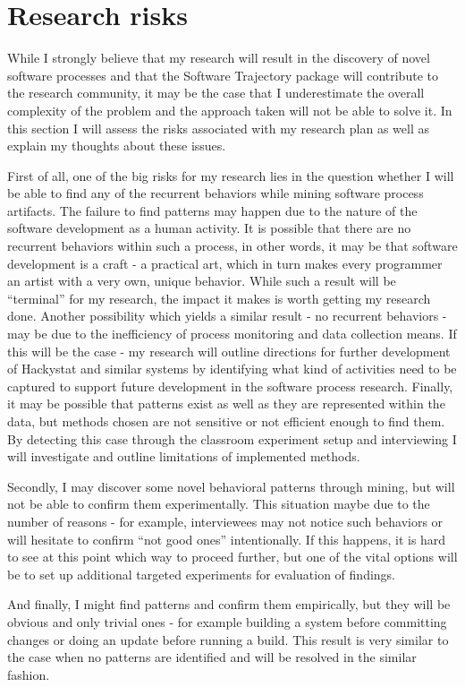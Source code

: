 \documentclass{sig-alternate}
\begin{document}
\section{Research risks}
While I strongly believe that my research will result in the discovery of novel software processes and that the Software Trajectory package will contribute to the research community, it may be the case that I underestimate the overall complexity of the problem and the approach taken will not be able to solve it. In this section I will assess the risks associated with my research plan as well as explain my thoughts about these issues.

First of all, one of the big risks for my research lies in the question whether I will be able to find any of the recurrent behaviors while mining software process artifacts. The failure to find patterns may happen due to the nature of the software development as a human activity. It is possible that there are no recurrent behaviors within such a process, in other words, it may be that software development is a craft - a practical art, which in turn makes every programmer an artist with a very own, unique behavior. While such a result will be ``terminal'' for my research, the impact it makes is worth getting my research done. Another possibility which yields a similar result - no recurrent behaviors - may be due to the inefficiency of process monitoring and data collection means. If this will be the case - my research will outline directions for further development of Hackystat and similar systems by identifying what kind of activities need to be captured to support future development in the software process research. Finally, it may be possible that patterns exist as well as they are represented within the data, but methods chosen are not sensitive or not efficient enough to find them. By detecting this case through the classroom experiment setup and interviewing I will investigate and outline limitations of implemented methods.

Secondly, I may discover some novel behavioral patterns through mining, but will not be able to confirm them experimentally. This situation maybe due to the number of reasons - for example, interviewees may not notice such behaviors or will hesitate to confirm ``not good ones'' intentionally. If this happens, it is hard to see at this point which way to proceed further, but one of the vital options will be to set up additional targeted experiments for evaluation of findings.

And finally, I might find patterns and confirm them empirically, but they will be obvious and only trivial ones - for example building a system before committing changes or doing an update before running a build. This result is very similar to the case when no patterns are identified and will be resolved in the similar fashion.
\end{document}
